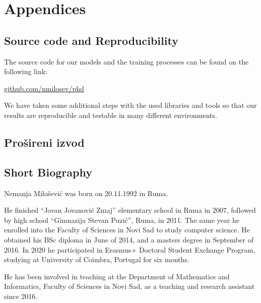 \documentclass[b5paper]{book}
\newcommand{\skica}[1]{
    \noindent \framebox{\parbox[c]{0.9\textwidth}{  {\small** {#1}  }}
    \newline }
}
\begin{document}
\part{Appendices}
\chapter{Source code and Reproducibility}
\label{source}

The source code for our models and the training processes can be found on the following link: 

\begin{footnotesize}
\url{github.com/nmilosev/phd}
\end{footnotesize}

We have taken some additional steps with the used libraries and tools so that our results are reproducible and testable in many different environments.

\backmatter


{
  \raggedright
  \printbibliography[heading=bibintoc]
}


\chapter{Prošireni izvod}




\chapter{Short Biography}


Nemanja Milošević was born on 20.11.1992 in Ruma.

He finished ``Jovan Jovanović Zmaj'' elementary school in Ruma in 2007,
followed by high school ``Gimnazija Stevan Puzić'', Ruma, in 2011. The same year he enrolled into the Faculty of Sciences in Novi Sad to study computer science. He obtained his BSc diploma in June of 2014, and a masters degree in September of 2016. In 2020 he participated in Erasmus+ Doctoral Student Exchange Program, studying at University of Coimbra, Portugal for six months.

He has been involved in teaching at the Department of Mathematics and
Informatics, Faculty of Sciences in Novi Sad, as a teaching and research assistant since 2016.
\end{document}
